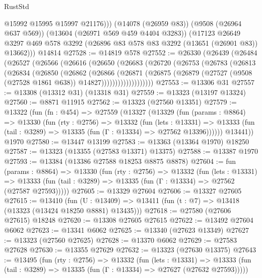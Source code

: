 \begin{lexlean}{RustStd}
\begin{coremodule}
            @15992
            @15995
            @15997
            @21176)))
      (@14078 (@26959 @83))
      (@9508 (@26964 @637 @569))
      (@13604 (@26971 @569 @459 @4404 @3283))
      (@17123
        @26649
        @3297
        @469
        @578
        @3292
        (@26896 @83 @578 @83 @3292 (@13651 (@26901 @83)) @13662)))
    @14814
@27528 := @14819 @578
@27552 := @26330
    (@26439
      (@26484
        (@26527
          (@26566
            (@26616
              (@26650
                (@26683
                  (@26720
                    (@26753
                      (@26783
                        (@26813
                          (@26834
                            (@26850
                              (@26862
                                (@26866
                                  (@26871
                                    (@26875
                                      (@26879
                                        (@27527
                                          (@9508 (@27528 @1861 @638))
                                          @14827)))))))))))))))))))
@27553 := @13306 @31
@27557 := @13308 (@13312 @31) (@13318 @31)
@27559 := @13323 (@13197 @13324)
@27560 := @8871 @11915
@27562 := @13323 (@27560 @13351)
@27579 := @13322
    (fun (fn : @454) =>
    @27559
      (@13327
        (@13329
          (fun (params : @8864) =>
          @13330
            (fun (rty : @2756) =>
            @13332
              (fun (lets : @13331) =>
              @13333 (fun (tail : @3289) => @13335 (fun (Γ : @13334) => @27562 @13396))))))
        @13441))
    @1970
@27580 := @13447 @13199
@27583 := @13363 (@13364 @1970) @18250
@27587 := @13323 (@13355 (@27583 @13371) @13375)
@27588 := @13387 @1970
@27593 := @13384 (@13386 @27588 @18253 @8875 @8878)
@27604 := fun (params : @8864) =>
  @13330
    (fun (rty : @2756) =>
    @13332
      (fun (lets : @13331) =>
      @13333 (fun (tail : @3289) => @13335 (fun (Γ : @13334) => @27562 (@27587 @27593)))))
@27605 := @13329 @27604
@27606 := @13327 @27605
@27615 := @13410
    (fun (U : @13409) => @13411 (fun (t : @7) => @13418 (@13323 (@13424 @18250 @8881) @13435)))
@27618 := @27580 (@27606 @27615) @18248
@27620 := @13308 @27605 @27615
@27622 := @13492 @27604 @6062
@27623 := @13341 @6062
@27625 := @13340 (@27623 @13349)
@27627 := @13323 (@27560 @27625)
@27628 := @13370 @6062
@27629 := @27583 @27628
@27630 := @13355 @27629
@27632 := @13323 (@27630 @13375)
@27643 := @13495
    (fun (rty : @2756) =>
    @13332
      (fun (lets : @13331) =>
      @13333 (fun (tail : @3289) => @13335 (fun (Γ : @13334) => @27627 (@27632 @27593)))))

\end{coremodule}
\end{lexlean}
